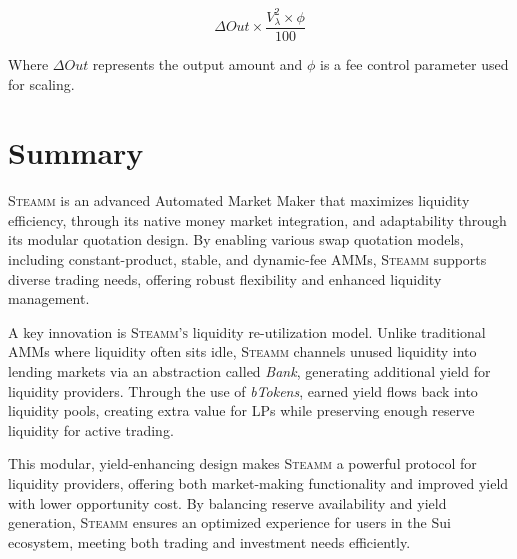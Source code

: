 \documentclass[sigconf,nonacm,prologue,table]{acmart}
\numberwithin{equation}{section}
\theoremstyle{definition}
\theoremstyle{remark}
\begin{document}
\begin{equation}
\Delta Out \times \frac{V_{\lambda}^2 \times \phi}{100}
\tag{5.3.6}
\end{equation}

Where $\Delta Out$ represents the output amount and $\phi$ is a fee control parameter used for scaling.

\section{Summary} \label{summary}

\textsc{Steamm} is an advanced Automated Market Maker that maximizes liquidity efficiency, through its native money market integration, and adaptability through its modular quotation design. By enabling various swap quotation models, including constant-product, stable, and dynamic-fee AMMs, \textsc{Steamm} supports diverse trading needs, offering robust flexibility and enhanced liquidity management.

A key innovation is \textsc{Steamm's} liquidity re-utilization model. Unlike traditional AMMs where liquidity often sits idle, \textsc{Steamm} channels unused liquidity into lending markets via an abstraction called \emph{Bank}, generating additional yield for liquidity providers. Through the use of \emph{bTokens}, earned yield flows back into liquidity pools, creating extra value for LPs while preserving enough reserve liquidity for active trading.

This modular, yield-enhancing design makes \textsc{Steamm} a powerful protocol for liquidity providers, offering both market-making functionality and improved yield with lower opportunity cost. By balancing reserve availability and yield generation, \textsc{Steamm} ensures an optimized experience for users in the Sui ecosystem, meeting both trading and investment needs efficiently.
\end{document}
